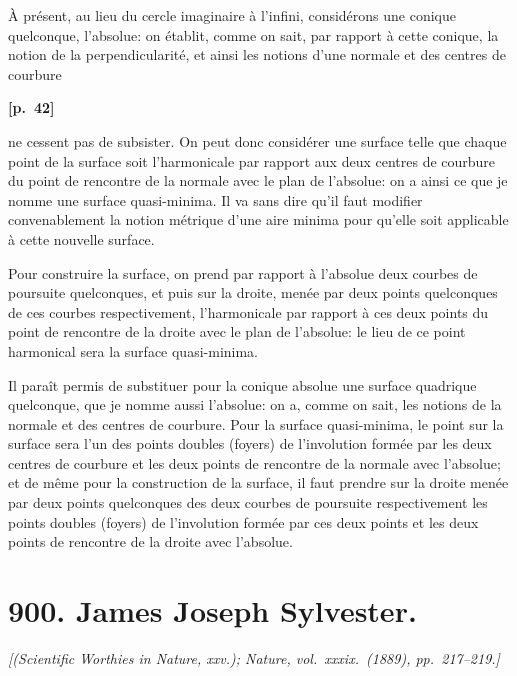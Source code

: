 \documentclass[11pt,a4paper]{book}
\begin{document}
\`A pr\'esent, au lieu du cercle imaginaire \`a l'infini, consid\'erons une conique quelconque, l'absolue: on \'etablit, comme on sait, par rapport \`a cette conique, la notion de la perpendicularit\'e, et ainsi les notions d'une normale et des centres de courbure

\vspace{0.5em}
\noindent\textbf{[p.\ 42]}

ne cessent pas de subsister. On peut donc consid\'erer une surface telle que chaque point de la surface soit l'harmonicale par rapport aux deux centres de courbure du point de rencontre de la normale avec le plan de l'absolue: on a ainsi ce que je nomme une surface quasi-minima. Il va sans dire qu'il faut modifier convenablement la notion m\'etrique d'une aire minima pour qu'elle soit applicable \`a cette nouvelle surface.

Pour construire la surface, on prend par rapport \`a l'absolue deux courbes de poursuite quelconques, et puis sur la droite, men\'ee par deux points quelconques de ces courbes respectivement, l'harmonicale par rapport \`a ces deux points du point de rencontre de la droite avec le plan de l'absolue: le lieu de ce point harmonical sera la surface quasi-minima.

Il para\^it permis de substituer pour la conique absolue une surface quadrique quelconque, que je nomme aussi l'absolue: on a, comme on sait, les notions de la normale et des centres de courbure. Pour la surface quasi-minima, le point sur la surface sera l'un des points doubles (foyers) de l'involution form\'ee par les deux centres de courbure et les deux points de rencontre de la normale avec l'absolue; et de m\^eme pour la construction de la surface, il faut prendre sur la droite men\'ee par deux points quelconques des deux courbes de poursuite respectivement les points doubles (foyers) de l'involution form\'ee par ces deux points et les deux points de rencontre de la droite avec l'absolue.

\newpage

\section*{900. James Joseph Sylvester.}

\noindent\textit{[(Scientific Worthies in Nature, xxv.); Nature, vol.\ xxxix.\ (1889), pp.\ 217--219.]}
\end{document}
